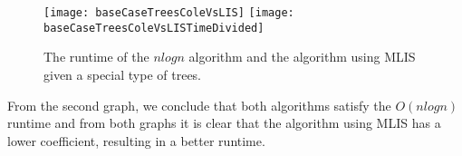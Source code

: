 \begin{figure}
	\texttt{[image: baseCaseTreesColeVsLIS]}
	\texttt{[image: baseCaseTreesColeVsLISTimeDivided]}
	\caption{The runtime of the $nlogn$ algorithm and the algorithm using MLIS given a special type of trees.}
	\label{baseCaseTreesColeVsLIS}
\end{figure}

From the second graph, we conclude that both algorithms satisfy the $O(nlogn)$ runtime and from both graphs it is clear that the algorithm using MLIS has a lower coefficient, resulting in a better runtime.



